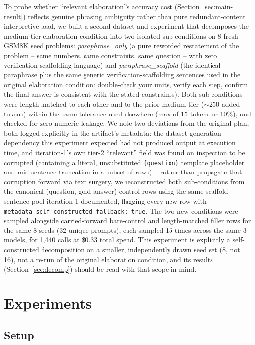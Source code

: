 \documentclass[11pt,letterpaper]{article}
\begin{document}
To probe whether ``relevant elaboration''s accuracy cost (Section~\ref{sec:main-result}) reflects genuine phrasing ambiguity rather than pure redundant-content interpretive load, we built a second dataset and experiment that decomposes the medium-tier elaboration condition into two isolated sub-conditions on 8 fresh GSM8K seed problems: \emph{paraphrase\_only} (a pure reworded restatement of the problem -- same numbers, same constraints, same question -- with zero verification-scaffolding language) and \emph{paraphrase\_scaffold} (the identical paraphrase plus the same generic verification-scaffolding sentences used in the original elaboration condition: double-check your units, verify each step, confirm the final answer is consistent with the stated constraints). Both sub-conditions were length-matched to each other and to the prior medium tier ($\sim$250 added tokens) within the same tolerance used elsewhere (max of 15 tokens or 10\%), and checked for zero numeric leakage. We note two deviations from the original plan, both logged explicitly in the artifact's metadata: the dataset-generation dependency this experiment expected had not produced output at execution time, and iteration-1's own tier-2 ``relevant'' field was found on inspection to be corrupted (containing a literal, unsubstituted \texttt{\{question\}} template placeholder and mid-sentence truncation in a subset of rows) -- rather than propagate that corruption forward via text surgery, we reconstructed both sub-conditions from the canonical (question, gold-answer) control rows using the same scaffold-sentence pool iteration-1 documented, flagging every new row with \texttt{metadata\_self\_constructed\_fallback: true}. The two new conditions were sampled alongside carried-forward bare-control and length-matched filler rows for the same 8 seeds (32 unique prompts), each sampled 15 times across the same 3 models, for 1,440 calls at \$0.33 total spend. This experiment is explicitly a self-constructed decomposition on a smaller, independently drawn seed set (8, not 16), not a re-run of the original elaboration condition, and its results (Section~\ref{sec:decomp}) should be read with that scope in mind.

\section{Experiments}
\label{sec:experiments}

\subsection{Setup}
\label{sec:setup}
\end{document}
